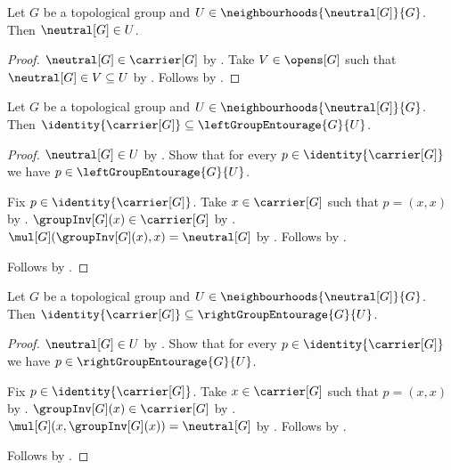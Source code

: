 \begin{proposition}\label{topological_group_identity_neighbourhood_contains_identity}
    Let $G$ be a topological group and
        $U\in\neighbourhoods{\neutral[G]}{G}$.
    Then $\neutral[G]\in U$.
\end{proposition}
\begin{proof}
    $\neutral[G]\in\carrier[G]$ by .
    Take $V\in\opens[G]$ such that
        $\neutral[G]\in V\subseteq U$ by .
    Follows by .
\end{proof}

\begin{proposition}\label{left_group_entourage_diagonal}
    Let $G$ be a topological group and
        $U\in\neighbourhoods{\neutral[G]}{G}$.
    Then $\identity{\carrier[G]}
        \subseteq\leftGroupEntourage{G}{U}$.
\end{proposition}
\begin{proof}
    $\neutral[G]\in U$
        by .
    Show that for every $p\in\identity{\carrier[G]}$ we have
        $p\in\leftGroupEntourage{G}{U}$.
    \begin{subproof}
        Fix $p\in\identity{\carrier[G]}$.
        Take $x\in\carrier[G]$ such that $p=(x,x)$
            by .
        $\groupInv[G](x)\in\carrier[G]$
            by .
        $\mul[G](\groupInv[G](x),x)=\neutral[G]$
            by .
        Follows by .
    \end{subproof}
    Follows by .
\end{proof}

\begin{proposition}\label{right_group_entourage_diagonal}
    Let $G$ be a topological group and
        $U\in\neighbourhoods{\neutral[G]}{G}$.
    Then $\identity{\carrier[G]}
        \subseteq\rightGroupEntourage{G}{U}$.
\end{proposition}
\begin{proof}
    $\neutral[G]\in U$
        by .
    Show that for every $p\in\identity{\carrier[G]}$ we have
        $p\in\rightGroupEntourage{G}{U}$.
    \begin{subproof}
        Fix $p\in\identity{\carrier[G]}$.
        Take $x\in\carrier[G]$ such that $p=(x,x)$
            by .
        $\groupInv[G](x)\in\carrier[G]$
            by .
        $\mul[G](x,\groupInv[G](x))=\neutral[G]$
            by .
        Follows by .
    \end{subproof}
    Follows by .
\end{proof}

